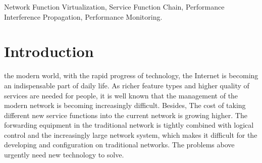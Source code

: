 \documentclass{ieeeaccess}
\begin{document}


\title{}
\author{}


\begin{abstract}
The proposal of network function virtualization(NFV) promotes network functions to run on commodity hardware in the form of software applications, which perfectly decouples the software implementation of network functions from the underlying hardware and reduces capital investment and energy consumption. With the widespread deployment of VNF applications, how to monitor and analyze NFV performance becomes a challenging issue. In present, the performance analysis method is at the VNF level, and the calculation of the delay and throughput of the user request is a simple addition after the request processing is completed. It ignores the propagation of performance interference, which will inevitably lead to incorrect performance analysis and inappropriate mapping policy. Given the above problems, this paper proposes a SFC performance inference propagation analysis algorithm. Based on the flow information of the requested service function chain and the global physical resource usage, a global SFC performance impact calculation analysis is performed on the newly arrived user request, which helping to monitor the performance of SFC indirectly in a global view and providing a reference for the mapping scheme of different mapping targets, preventing causing serious SLA violation as well.
\end{abstract}

\begin{keywords}
Network Function Virtualization, Service Function Chain, Performance Interference Propagation, Performance Monitoring.
\end{keywords}

\titlepgskip=-15pt
\maketitle

\section{Introduction}
\label{sec:introduction}
 the modern world, with the rapid progress of technology, the Internet is becoming an indispensable part of daily life. As richer feature types and higher quality of services are needed for people, it is well known that the management of the modern network is becoming increasingly difficult. Besides, The cost of taking different new service functions into the current network is growing higher. The forwarding equipment in the traditional network is tightly combined with logical control and the increasingly large network system, which makes it difficult for the developing and configuration on traditional networks. The problems above urgently need new technology to solve.
\end{document}
